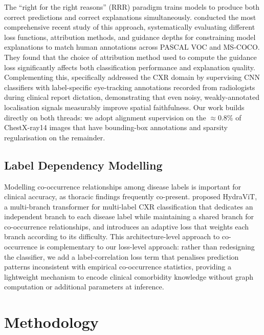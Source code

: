 \documentclass[12pt, a4paper]{article}
\begin{document}
The ``right for the right reasons'' (RRR) paradigm trains models to produce both correct
predictions and correct explanations simultaneously. \citet{rao2023} conducted the most
comprehensive recent study of this approach, systematically evaluating different loss
functions, attribution methods, and guidance depths for constraining model explanations to
match human annotations across PASCAL VOC and MS-COCO. They found that the choice of
attribution method used to compute the guidance loss significantly affects both
classification performance and explanation quality. Complementing this,
\citet{lanfredi2023} specifically addressed the CXR domain by supervising CNN classifiers
with label-specific eye-tracking annotations recorded from radiologists during clinical
report dictation, demonstrating that even noisy, weakly-annotated localisation signals
measurably improve spatial faithfulness. Our work builds directly on both threads:
we adopt alignment supervision on the $\approx$0.8\% of ChestX-ray14 images that have
bounding-box annotations and sparsity regularisation on the remainder.

\subsection{Label Dependency Modelling}

Modelling co-occurrence relationships among disease labels is important for clinical
accuracy, as thoracic findings frequently co-present. \citet{hydravit2024} proposed
HydraViT, a multi-branch transformer for multi-label CXR classification that dedicates
an independent branch to each disease label while maintaining a shared branch for
co-occurrence relationships, and introduces an adaptive loss that weights each branch
according to its difficulty. This architecture-level approach to co-occurrence is
complementary to our loss-level approach: rather than redesigning the classifier, we
add a label-correlation loss term that penalises prediction patterns inconsistent with
empirical co-occurrence statistics, providing a lightweight mechanism to encode clinical
comorbidity knowledge without graph computation or additional parameters at inference.

\section{Methodology}
\end{document}
